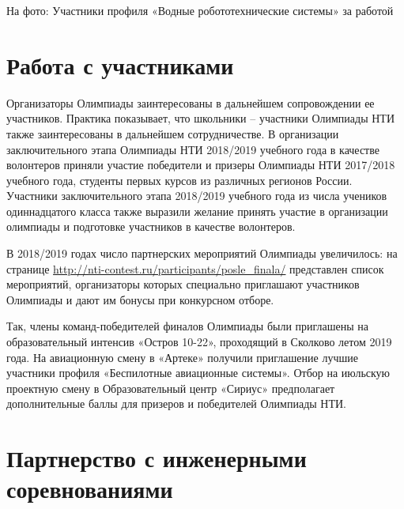 






\begin{center}
    На фото: Участники профиля «Водные робототехнические системы» за работой
\end{center}

\section*{Работа с участниками}

Организаторы Олимпиады заинтересованы в дальнейшем сопровождении ее участников. Практика показывает, что школьники  –  участники Олимпиады НТИ также заинтересованы в дальнейшем сотрудничестве. В организации заключительного этапа Олимпиады НТИ 2018/2019 учебного года в качестве волонтеров приняли участие победители и призеры Олимпиады НТИ 2017/2018 учебного года, студенты первых курсов из различных регионов России. Участники заключительного этапа 2018/2019 учебного года из числа учеников одиннадцатого класса также выразили желание принять участие в организации олимпиады и подготовке участников в качестве волонтеров.  

В 2018/2019 годах число партнерских мероприятий Олимпиады увеличилось: на странице \url{http://nti-contest.ru/participants/posle_finala/} представлен список мероприятий, организаторы которых специально приглашают участников Олимпиады и дают им бонусы при конкурсном отборе.

Так, члены команд-победителей финалов Олимпиады были приглашены на образовательный интенсив «Остров 10-22», проходящий в Сколково летом 2019 года.  На авиационную смену в «Артеке» получили приглашение лучшие участники профиля «Беспилотные авиационные системы». Отбор на июльскую проектную смену в Образовательный центр «Сириус» предполагает дополнительные баллы для призеров и победителей Олимпиады НТИ.

\section*{Партнерство с инженерными соревнованиями}


